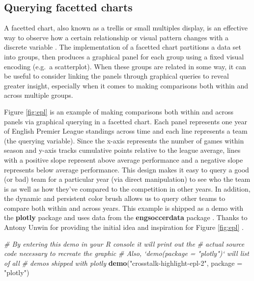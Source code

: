 \documentclass[
  12pt,
]{krantz}
\newenvironment{Shaded}{\begin{snugshade}}{\end{snugshade}}
\newcommand{\CommentTok}[1]{\textcolor[rgb]{0.56,0.35,0.01}{\textit{#1}}}
\newcommand{\DataTypeTok}[1]{\textcolor[rgb]{0.13,0.29,0.53}{#1}}
\newcommand{\KeywordTok}[1]{\textcolor[rgb]{0.13,0.29,0.53}{\textbf{#1}}}
\newcommand{\NormalTok}[1]{#1}
\newcommand{\StringTok}[1]{\textcolor[rgb]{0.31,0.60,0.02}{#1}}
\begin{document}
\hypertarget{trellis-linking}{%
\subsection{Querying facetted charts}\label{trellis-linking}}

A facetted chart, also known as a trellis or small multiples display, is an effective way to observe how a certain relationship or visual pattern changes with a discrete variable \citep{trellis} \citep{tufte2001}. The implementation of a facetted chart partitions a data set into groups, then produces a graphical panel for each group using a fixed visual encoding (e.g.~a scatterplot). When these groups are related in some way, it can be useful to consider linking the panels through graphical queries to reveal greater insight, especially when it comes to making comparisons both within and across multiple groups.

Figure \ref{fig:epl} is an example of making comparisons both within and across panels via graphical querying in a facetted chart. Each panel represents one year of English Premier League standings across time and each line represents a team (the querying variable). Since the x-axis represents the number of games within season and y-axis tracks cumulative points relative to the league average, lines with a positive slope represent above average performance and a negative slope represents below average performance. This design makes it easy to query a good (or bad) team for a particular year (via direct manipulation) to see who the team is as well as how they've compared to the competition in other years. In addition, the dynamic and persistent color brush allows us to query other teams to compare both within and across years. This example is shipped as a demo with the \textbf{plotly} package and uses data from the \textbf{engsoccerdata} package \citep{engsoccerdata}. Thanks to Antony Unwin for providing the initial idea and inspiration for Figure \ref{fig:epl} \citep{unwin-epl}.

\begin{Shaded}
\begin{Highlighting}[]
\CommentTok{# By entering this demo in your R console it will print out the }
\CommentTok{# actual source code necessary to recreate the graphic}
\CommentTok{# Also, `demo(package = "plotly")` will list of all }
\CommentTok{# demos shipped with plotly}
\KeywordTok{demo}\NormalTok{(}\StringTok{"crosstalk-highlight-epl-2"}\NormalTok{, }\DataTypeTok{package =} \StringTok{"plotly"}\NormalTok{)}
\end{Highlighting}
\end{Shaded}
\end{document}
